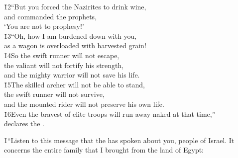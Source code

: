 \begin{poetry}
\poeml \v{12}``But you forced the Nazirites to drink wine, \\
\poemll    and commanded the prophets, \\
\poemlll       `You are not to prophesy!' \\
\poeml \v{13}``Oh, how I am burdened down with you, \\
\poemll    as a wagon is overloaded with harvested grain! \\
\poeml \v{14}So the swift runner will not escape, \\
\poemll    the valiant will not fortify his strength, \\
\poemlll       and the mighty warrior will not save his life. \\
\poeml \v{15}The skilled archer will not be able to stand, \\
\poemll    the swift runner will not survive, \\
\poemlll       and the mounted rider will not preserve his own life. \\
\poeml \v{16}Even the bravest of elite troops will run away naked at that time,'' \\
\poemll    declares the .
\end{poetry}

\v{1}``Listen to this message that the  has spoken about you, people of Israel. It concerns the entire family that I brought from the land of Egypt:


